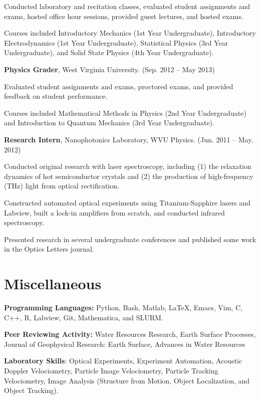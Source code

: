 \documentclass[11pt,letterpaper]{article}
\renewenvironment{itemize}{
	\begin{list}{}{
			\setlength{\leftmargin}{1.5em}
			\setlength{\rightmargin}{0em}  %
			\setlength{\itemsep}{0.25em}
			\setlength{\parskip}{0pt}
			\setlength{\parsep}{0.25em}
		}
	}{
	\end{list}
}
\newenvironment{itemizeit}
{\itemize\let\origitem\item
	\renewcommand{\item}[1][default]
	{\origitem[\tiny $\blacksquare$]}}
{\enditemize}
\renewenvironment{itemize}{
	\begin{list}{}{
			\setlength{\leftmargin}{1.5em}
			\setlength{\itemsep}{0.25em}
			\setlength{\parskip}{0pt}
			\setlength{\parsep}{0.25em}
		}
	}{
	\end{list}
}
\begin{document}
\begin{itemize}
	\begin{itemizeit}
		\item Conducted laboratory and recitation classes, evaluated student assignments and exams, hosted office hour sessions, provided guest lectures, and hosted exams.
		\item Courses included Introductory Mechanics (1st Year Undergraduate), Introductory Electrodynamics (1st Year Undergraduate), Statistical Physics (3rd Year Undergraduate), and Solid State Physics (4th Year Undergraduate).
	\end{itemizeit}


\item {\bf Physics Grader}, West Virginia University. \hfill (Sep. 2012 -- May 2013)

\begin{itemizeit}
	\item Evaluated student assignments and exams, proctored exams, and provided feedback on student performance.
	\item Courses included Mathematical Methods in Physics (2nd Year Undergraduate) and Introduction to Quantum Mechanics (3rd Year Undergraduate).
\end{itemizeit}

\item {\bf Research Intern}, Nanophotonics Laboratory, WVU Physics. \hfill (Jun. 2011 -- May. 2012)

\begin{itemizeit}
	\item Conducted original research with laser spectroscopy, including (1) the relaxation dynamics of hot semiconductor crystals and (2) the production of high-frequency (THz) light from optical rectification.
	\item Constructed automated optical experiments using Titanium-Sapphire lasers and Labview, built a lock-in amplifiers from scratch, and conducted infrared spectroscopy.
	\item Presented research in several undergraduate conferences and published some work in the Optics Letters journal.
\end{itemizeit}

\end{itemize}

	\section*{Miscellaneous}
	\begin{itemize}
		\item \textbf{Programming Languages:} Python, Bash, Matlab, \LaTeX, Emacs, Vim, C, C++, R, Labview, Git, Mathematica, and SLURM.
		\item \textbf{Peer Reviewing Activity:} Water Resources Research, Earth Surface Processes, Journal of Geophysical Research: Earth Surface, Advances in Water Resources
		\item \textbf{Laboratory Skills}: Optical Experiments, Experiment Automation, Acoustic Doppler Velociometry, Particle Image Velociometry, Particle Tracking Velociometry, Image Analysis (Structure from Motion, Object Localization, and Object Tracking).
	\end{itemize}
	\vfill
\end{document}
